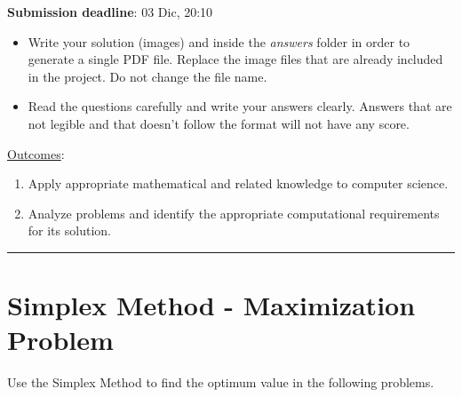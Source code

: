 



\textbf{Submission deadline}: 03 Dic, 20:10\\ 

\begin{itemize}
    \item Write your solution (images) and inside the \emph{answers} folder in order to generate a single PDF file. Replace the image files that are already included in the project. Do not change the file name.
    \item Read the questions carefully and write your answers clearly. Answers that are not legible and that doesn't follow the format will not have any score. 
\end{itemize}

\underline{Outcomes}:

\begin{enumerate}[label=\alph*.]
    \item Apply appropriate mathematical and related knowledge to computer science.
    \item Analyze problems and identify the appropriate computational requirements for its solution.
\end{enumerate}
\noindent\rule{\textwidth}{0.01pt}
\vspace{3mm}

\section{Simplex Method - Maximization Problem}

Use the Simplex Method to find the optimum value in the following problems.

